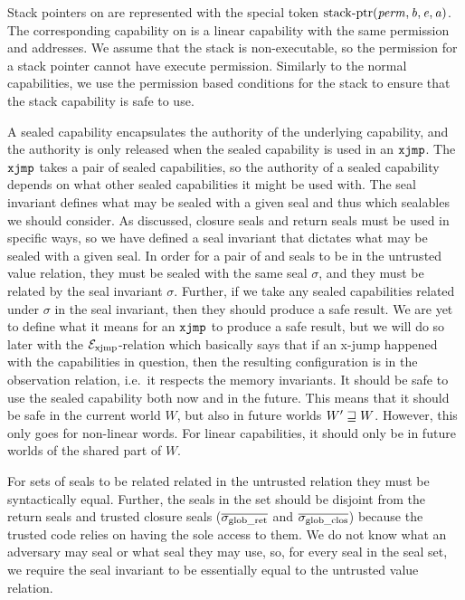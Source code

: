 \begin{jversion}
Stack pointers on \srccm{} are represented with the special token $\mathrm{stack\text{-}ptr}(\mathit{perm},\mathit{b},\mathit{e},\mathit{a})$.
The corresponding capability on \trgcm{} is a linear capability with the same permission and addresses.
We assume that the stack is non-executable, so the permission for a stack pointer cannot have execute permission.
Similarly to the normal capabilities, we use the permission based conditions for the stack to ensure that the stack capability is safe to use.

A sealed capability encapsulates the authority of the underlying capability, and the authority is only released when the sealed capability is used in an $\txjmp{}{}$.
The $\xjmp{}{}$ takes a pair of sealed capabilities, so the authority of a sealed capability depends on what other sealed capabilities it might be used with.
The seal invariant defines what may be sealed with a given seal and thus which sealables we should consider.
As discussed, closure seals and return seals must be used in specific ways, so we have defined a seal invariant that dictates what may be sealed with a given seal.
In order for a pair of \srccm{} and \trgcm{} seals to be in the untrusted value relation, they must be sealed with the same seal $\sigma$, and they must be related by the seal invariant $\sigma$.
Further, if we take any sealed capabilities related under $\sigma$ in the seal invariant, then they should produce a safe result.
We are yet to define what it means for an $\txjmp{}{}$ to produce a safe result, but we will do so later with the $\mathcal{E}_\mathrm{xjmp}$-relation which basically says that if an x-jump happened with the capabilities in question, then the resulting configuration is in the observation relation, i.e.\ it respects the memory invariants.
It should be safe to use the sealed capability both now and in the future.
This means that it should be safe in the current world $W$, but also in future worlds $W' \sqsupseteq W$.
However, this only goes for non-linear words.
For linear capabilities, it should only be in future worlds of the shared part of $W$.

For sets of seals to be related related in the untrusted relation they must be syntactically equal.
Further, the seals in the set should be disjoint from the return seals and trusted closure seals ($\overline{\sigma_{\mathrm{glob\_ret}}}$ and $\overline{\sigma_{\mathrm{glob\_clos}}}$) because the trusted code relies on having the sole access to them.
We do not know what an adversary may seal or what seal they may use, so, for every seal in the seal set, we require the seal invariant to be essentially equal to the untrusted value relation.


\end{jversion}
